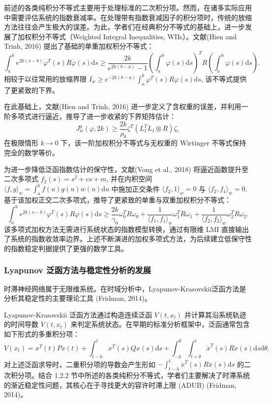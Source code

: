 \documentclass[a4paper, 12pt, oneside]{article}
\theoremstyle{cn_theorem}
\begin{document}
前述的各类纯积分不等式主要用于处理标准的二次积分项。然而，在诸多实际应用中需要评估系统的指数衰减率。在处理带有指数衰减因子的积分项时，传统的放缩方法往往会产生极大的误差。为此，学者们在经典积分不等式的基础上，进一步发展了加权积分不等式（Weighted Integral Inequalities, WIIs）。文献(Hien and Trinh, 2016) 提出了基础的单重加权积分不等式：
\begin{equation*}
    \int_a^b e^{2k(s-b)} \varphi^T(s) R \varphi(s) \mathrm{d}s \ge \frac{2k}{e^{2k(b-a)} - 1} \left( \int_a^b \varphi(s) \mathrm{d}s \right)^T R \left( \int_a^b \varphi(s) \mathrm{d}s \right).
\end{equation*}
相较于以往常用的放缩界限 $I_w \ge e^{-2k(b-a)} \int_a^b \varphi^T(s) R \varphi(s) \mathrm{d}s$, 该不等式提供了更紧致的下界。

在此基础上，文献(Hien and Trinh, 2016) 进一步定义了含权重的误差，并利用一阶多项式进行逼近，推导了进一步收紧的下界矩阵估计：
\begin{equation*}
    J_w^g(\varphi, 2k) \ge \frac{2k}{\rho_0} \zeta^T (L_1^T L_1 \otimes R) \zeta,
\end{equation*}
在极限情形 $k \to 0$ 下，该一阶加权积分不等式与无权重的 Wirtinger 不等式保持完全的数学等价。

为进一步降低泛函指数估计的保守性，文献(Vong et al., 2018) 将逼近函数提升至二次多项式 $f_2(s) = s^2 + cs + m$, 并在内积空间 $\langle f, g \rangle_w = \int_a^b f(u)g(u)w(u)\mathrm{d}u$ 中施加正交条件 $\langle f_2, 1 \rangle_w = 0$ 与 $\langle f_2, f_1 \rangle_w = 0$. 基于该加权正交二次多项式，推导了更紧致的单重与双重加权积分不等式：
\begin{equation*}
    \int_a^b e^{2k(s-b)} \varphi^T(s) R \varphi(s) \mathrm{d}s \ge \frac{2k}{\gamma_0} \omega_0^T R \omega_0 + \frac{1}{\langle f_1, f_1 \rangle_w} \omega_1^T R \omega_1 + \frac{1}{\langle f_2, f_2 \rangle_w} \omega_2^T R \omega_2.
\end{equation*}
该多项式加权方法无需进行系统状态的指数模型转换，通过有限维 LMI 直接输出了系统的指数收敛率边界。上述不断演进的加权多项式方法，为后续建立低保守性的指数稳定判据提供了更强的数学工具。

\subsubsection{Lyapunov 泛函方法与稳定性分析的发展}
时滞神经网络属于无限维系统。在时域分析中，Lyapunov-Krasovskii泛函方法是分析其稳定性的主要理论工具 (Fridman, 2014)。

Lyapunov-Krasovskii 泛函方法通过构造连续泛函 $V(t, x_t)$ 并计算其沿系统轨迹的时间导数 $\dot{V}(t, x_t)$ 来判定系统状态。在早期的标准分析框架中，泛函通常包含如下形式的多重积分项：
\begin{equation*}
    V(x_t) = x^T(t) P x(t) + \int_{t-h}^t x^T(s) Q x(s) \mathrm{d}s + \int_{-h}^0 \int_{t+\theta}^t \dot{x}^T(s) R \dot{x}(s) \mathrm{d}s \mathrm{d}\theta.
\end{equation*}
对上述泛函求导时，二重积分项的导数会产生形如 $-\int_{t-h}^t \dot{x}^T(s) R \dot{x}(s) \mathrm{d}s$ 的二次积分项。结合 1.2.2 节中所述的各类纯积分不等式，学者们主要解决了时滞系统的渐近稳定性问题，其核心在于寻找更大的容许时滞上限 (ADUB) (Fridman, 2014)。
\end{document}
